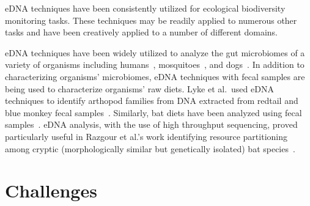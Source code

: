 \documentclass[letterpaper, 10pt, hidelinks]{article}
\begin{document}
eDNA techniques have been consistently utilized for ecological biodiversity monitoring 
tasks. These techniques may be 
readily applied to numerous other tasks and have been creatively applied to 
a number of different domains. 

eDNA techniques have been widely utilized to analyze the gut microbiomes of a variety of 
organisms including humans~\cite{Turnbaugh2009}, mosquitoes~\cite{Osei-Poku2012}, and
dogs~\cite{Swanson2011}. In addition to characterizing organisms' microbiomes, eDNA 
techniques with fecal samples are being used to characterize organisms' raw diets. 
Lyke et al.\ used eDNA techniques to identify arthopod families from DNA extracted 
from redtail and blue monkey fecal samples~\cite{Lyke2019}. Similarly, bat diets 
have been analyzed using fecal samples~\cite{Aldasoro2019, Razgour2011}. eDNA analysis, 
with the use of high throughput sequencing, proved particularly useful in Razgour et al.'s 
work identifying resource partitioning among cryptic (morphologically similar but 
genetically isolated) bat species~\cite{Razgour2011}. 

\section{Challenges}
\end{document}
